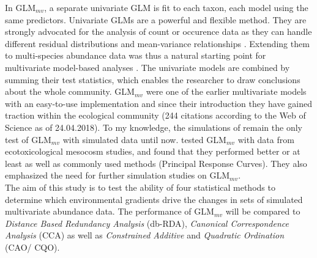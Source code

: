 	In GLM$_{mv}$, a separate univariate GLM is fit to each taxon, each model using the same predictors. 
	Univariate GLMs are a powerful and flexible method. 
	They are strongly advocated for the analysis of count or occurence data as they can handle different residual distributions and mean-variance relationships \citep{OHara2010, Warton2011, Szocs2015_b}.
	Extending them to multi-species abundance data was thus a natural starting point for multivariate model-based analyses \citep{Warton2012}.
	The univariate models are combined by  summing their test statistics, which enables the researcher to draw conclusions about the whole community.
	GLM$_{mv}$ were one of the earlier multivariate models with an easy-to-use implementation \citep[in the \textit{mvabund} R-package, ][]{Wang2018} and  
	since their introduction they have gained traction within the ecological community (244 citations according to the Web of Science as of 24.04.2018). 
	To my knowledge, the simulations of \citet{Warton2012} remain the only test of GLM$_{mv}$ with simulated data until now.
	\citet{Szocs2015} tested GLM$_{mv}$ with data from ecotoxicological mesocosm studies, and found that they performed better or at least as well as commonly used methods (Principal Response Curves).
	They also emphasized the need for further simulation studies on GLM$_{mv}$.\\

	
	The aim of this study is to test the ability of four statistical methods to determine which environmental gradients drive the changes in sets of simulated multivariate abundance data. 
	The performance of GLM$_{mv}$ will be compared to \textit{Distance Based Redundancy Analysis} (db-RDA), \textit{Canonical Correspondence Analysis} (CCA) as well as \textit{Constrained Additive} and \textit{Quadratic Ordination} (CAO/ CQO).

	
